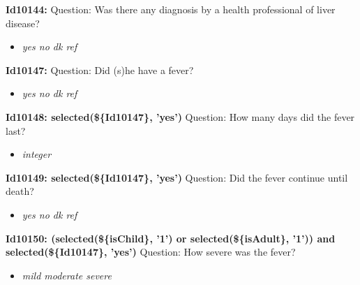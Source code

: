 \documentclass{article}%
\begin{document}
\textbf{Id10144: \newline%
}%
Question: Was there any diagnosis by a health professional of liver disease?\newline%
%
\begin{itemize}%
\item%
\textit{yes\newline%
 no\newline%
 dk\newline%
 ref\newline%
}%
\end{itemize}%
\textbf{Id10147: \newline%
}%
Question: Did (s)he have a fever?\newline%
%
\begin{itemize}%
\item%
\textit{yes\newline%
 no\newline%
 dk\newline%
 ref\newline%
}%
\end{itemize}%
\textbf{Id10148: selected(\$\{Id10147\}, 'yes')\newline%
}%
Question: How many days did the fever last?\newline%
%
\begin{itemize}%
\item%
\textit{integer\newline%
}%
\end{itemize}%
\textbf{Id10149: selected(\$\{Id10147\}, 'yes')\newline%
}%
Question: Did the fever continue until death?\newline%
%
\begin{itemize}%
\item%
\textit{yes\newline%
 no\newline%
 dk\newline%
 ref\newline%
}%
\end{itemize}%
\textbf{Id10150: (selected(\$\{isChild\}, '1') or selected(\$\{isAdult\}, '1')) and selected(\$\{Id10147\}, 'yes')\newline%
}%
Question: How severe was the fever?\newline%
%
\begin{itemize}%
\item%
\textit{mild\newline%
 moderate\newline%
 severe\newline%
}%
\end{itemize}%
\end{document}
